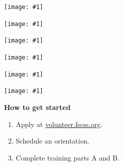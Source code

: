 \documentclass{beamer}
\newcommand{\pic}[1]{ \begin{frame}\texttt{[image: \#1]}\end{frame} }
\begin{document}
\pic{pear-blossom.jpg}
\pic{living-room.jpg}
\pic{donation-room.jpg}
\pic{snow.jpg}
\pic{straddle.jpg}
\pic{portrait.jpg}

\begin{frame}
  \textbf{\LARGE How to get started}\\
  \begin{enumerate}
    \item Apply at \url{volunteer.fscss.org}.
    \item Schedule an orientation.
    \item Complete training parts A and B.
  \end{enumerate}
\end{frame}
\end{document}
